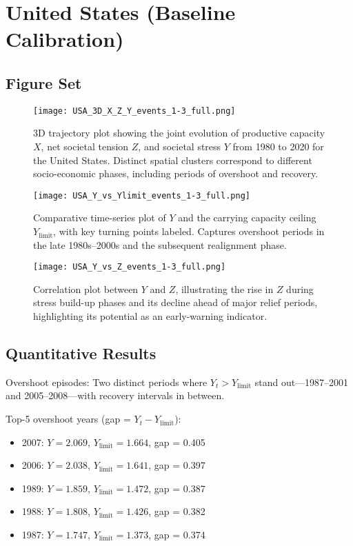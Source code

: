 \documentclass[12pt,a4paper]{article}
\begin{document}
\section{United States (Baseline Calibration)}
\subsection{Figure Set}

\begin{figure}[h]
    \centering
    \texttt{[image: USA\_3D\_X\_Z\_Y\_events\_1-3\_full.png]}
    \caption{3D trajectory plot showing the joint evolution of productive capacity $X$, net societal tension $Z$, and societal stress $Y$ from 1980 to 2020 for the United States. Distinct spatial clusters correspond to different socio-economic phases, including periods of overshoot and recovery.}
    \label{fig:us_3d_x_z_y}
\end{figure}

\begin{figure}[h]
    \centering
    \texttt{[image: USA\_Y\_vs\_Ylimit\_events\_1-3\_full.png]}
    \caption{Comparative time-series plot of $Y$ and the carrying capacity ceiling $Y_{\text{limit}}$, with key turning points labeled. Captures overshoot periods in the late 1980s–2000s and the subsequent realignment phase.}
    \label{fig:us_y_vs_ylimit}
\end{figure}

\begin{figure}[h]
    \centering
    \texttt{[image: USA\_Y\_vs\_Z\_events\_1-3\_full.png]}
    \caption{Correlation plot between $Y$ and $Z$, illustrating the rise in $Z$ during stress build-up phases and its decline ahead of major relief periods, highlighting its potential as an early-warning indicator.}
    \label{fig:us_y_vs_z}
\end{figure}

\subsection{Quantitative Results}
Overshoot episodes: Two distinct periods where $Y_t > Y_{\text{limit}}$ stand out—1987–2001 and 2005–2008—with recovery intervals in between.

Top-5 overshoot years (gap = $Y_t - Y_{\text{limit}}$):
\begin{itemize}
    \item 2007: $Y=2.069$, $Y_{\text{limit}}=1.664$, gap = 0.405
    \item 2006: $Y=2.038$, $Y_{\text{limit}}=1.641$, gap = 0.397
    \item 1989: $Y=1.859$, $Y_{\text{limit}}=1.472$, gap = 0.387
    \item 1988: $Y=1.808$, $Y_{\text{limit}}=1.426$, gap = 0.382
    \item 1987: $Y=1.747$, $Y_{\text{limit}}=1.373$, gap = 0.374
\end{itemize}
\end{document}
